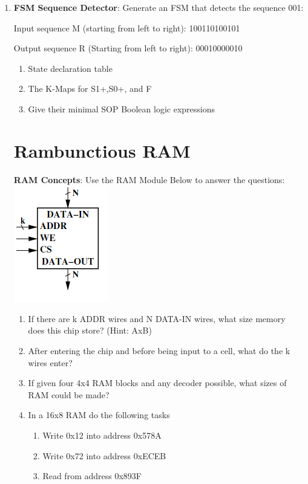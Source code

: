 \documentclass{article}
\begin{document}
\begin{enumerate}[label=(\alph*)]
    \item \textbf{FSM Sequence Detector}: Generate an FSM that detects the sequence 001: 
    
    Input sequence M (starting from left to right):  100110100101  
    
    Output sequence R (Starting from left to right):  00010000010

    \begin{enumerate}[label=(\roman*),nolistsep,itemsep = 60pt]
        \item State declaration table
        \item The K-Maps for S1+,S0+, and F
        \item Give their minimal SOP Boolean logic expressions
    
    \end{enumerate}


\newpage
\section{Rambunctious RAM}
    \textbf{RAM Concepts}: Use the RAM Module Below to answer the questions:
    \newline
    \includegraphics{figures/RAM.png}
    \begin{enumerate}[label=(\alph*),itemsep = 10pt]
        \item If there are k ADDR wires and N DATA-IN wires, what size memory does this chip store? (Hint: AxB)
        \item After entering the chip and before being input to a cell, what do the k wires enter?
        \item If given four 4x4 RAM blocks and any decoder possible, what sizes of RAM could be made?
        \item In a 16x8 RAM do the following tasks
        \begin{enumerate}[label=(\roman*),itemsep = 10pt]
            \item Write 0x12 into address 0x578A
            \item Write 0x72 into address 0xECEB
            \item Read from address 0x893F
        \end{enumerate}
    \end{enumerate}

\end{enumerate}
\end{document}
